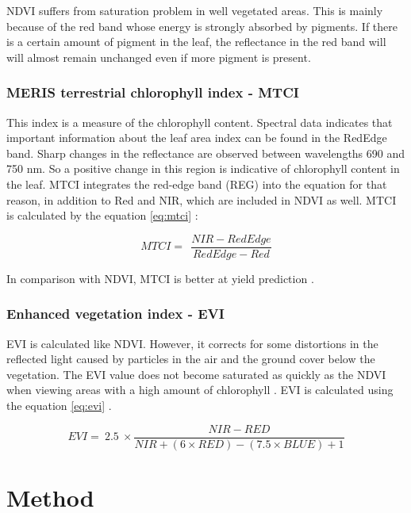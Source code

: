 \documentclass[sigconf, nonacm, natbib, screen, balance=False]{acmart}
\begin{document}
NDVI suffers from saturation problem in well vegetated areas. This is mainly because of the red band whose energy is strongly absorbed by pigments. If there is a certain amount of pigment in the leaf, the reflectance in the red band will will almost remain unchanged even if more pigment is present\citep{wang2003}.


\subsubsection{ MERIS terrestrial chlorophyll index - MTCI}\label{sec:mtci}

This index is a measure of the chlorophyll content. Spectral data indicates that important information about the leaf area index can be found in the RedEdge band. Sharp changes in the reflectance are observed between wavelengths 690 and 750 nm. So a positive change in this region is indicative of chlorophyll content in the leaf\citep{DELEGIDO201342}. MTCI integrates the red-edge band (REG) into the equation for that reason, in addition to Red and NIR, which are included in NDVI as well. MTCI is calculated by the equation \ref{eq:mtci} \citep{dash2004meris}:

\begin{equation}
  \label{eq:mtci}
MTCI=\ \ \frac{NIR-RedEdge}{RedEdge-Red}
\end{equation}

In comparison with NDVI, MTCI is better at yield prediction \citep{Zhang2014}. 


\subsubsection{Enhanced vegetation index - EVI}\label{sec:evi}

EVI is calculated like NDVI. However, it corrects for some distortions in the reflected light caused by particles in the air and the ground cover below the vegetation. The EVI value does not become saturated as quickly as the NDVI when viewing areas with a high amount of chlorophyll \citep{Lein2012}. EVI is calculated using the equation \ref{eq:evi} \citep{HUETE1994224, Lein2012, rs2012}.

\begin{equation}
  \label{eq:evi}
EVI=\ 2.5\ \times\frac{NIR-RED}{NIR+(6\times R E D)-(7.5\times B L U E)+1}
\end{equation}


\section{Method}\label{sec:method}
\end{document}
